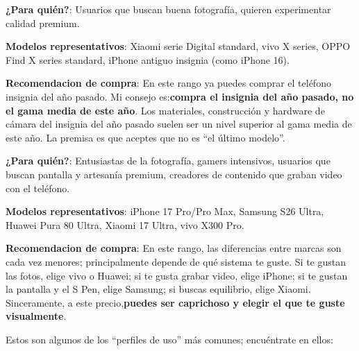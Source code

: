 \textbf{¿Para quién?}: Usuarios que buscan buena fotografía, quieren experimentar calidad premium.

\textbf{Modelos representativos}: Xiaomi serie Digital standard, vivo X series, OPPO Find X series standard, iPhone antiguo insignia (como iPhone 16).

\textbf{Recomendacion de compra}: En este rango ya puedes comprar el teléfono insignia del año pasado. Mi consejo es:\textbf{compra el insignia del año pasado, no el gama media de este año}. Los materiales, construcción y hardware de cámara del insignia del año pasado suelen ser un nivel superior al gama media de este año. La premisa es que aceptes que no es “el último modelo”.


\textbf{¿Para quién?}: Entusiastas de la fotografía, gamers intensivos, usuarios que buscan pantalla y artesanía premium, creadores de contenido que graban video con el teléfono.

\textbf{Modelos representativos}: iPhone 17 Pro/Pro Max, Samsung S26 Ultra, Huawei Pura 80 Ultra, Xiaomi 17 Ultra, vivo X300 Pro.

\textbf{Recomendacion de compra}: En este rango, las diferencias entre marcas son cada vez menores; principalmente depende de qué sistema te guste. Si te gustan las fotos, elige vivo o Huawei; si te gusta grabar video, elige iPhone; si te gustan la pantalla y el S Pen, elige Samsung; si buscas equilibrio, elige Xiaomi. Sinceramente, a este precio,\textbf{puedes ser caprichoso y elegir el que te guste visualmente}.


Estos son algunos de los “perfiles de uso” más comunes; encuéntrate en ellos:

